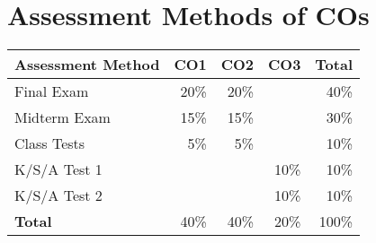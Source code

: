 \section{Assessment Methods of COs}
\label{sc_assessment_methods}
\newcommand{\asme}{\bf Assessment Method}
\begin{center}
\begin{longtable}{l r r r r}
\toprule
{\asme} & {\bf CO1} & {\bf CO2} & {\bf CO3} & {\bf Total}\\ 
\midrule
{Final Exam}    & {20\%} & {20\%} & {    } & {40\%}\\
{Midterm Exam}  & {15\%} & {15\%} & {    } & {30\%}\\ 
{Class Tests}   & { 5\%} & { 5\%} & {    } & {10\%}\\ 
{K/S/A Test 1}  & {    } & {  } & { 10\%} & {10\%}\\ 
{K/S/A Test 2}  & {    } & {  } & { 10\%} & {10\%}\\
\midrule 
{\bf Total}     & {40\%} & {40\%} & {20\%} & {100\%}\\ \bottomrule
\end{longtable}
\end{center}
